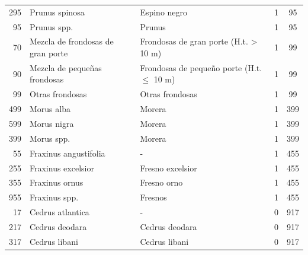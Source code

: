 \begin{longtable}{r p{4cm} p{5cm} c c}
    295           & Prunus spinosa                    & Espino negro                                  & 1             & 95             \\
    95            & Prunus spp.                       & Prunus                                        & 1             & 95             \\
    70            & Mezcla de frondosas de gran porte & Frondosas de gran porte (H.t. > 10 m)         & 1             & 99             \\
    90            & Mezcla de pequeñas frondosas      & Frondosas de pequeño porte (H.t. $\leq$ 10 m) & 1             & 99             \\
    99            & Otras frondosas                   & Otras frondosas                               & 1             & 99             \\
    499           & Morus alba                        & Morera                                        & 1             & 399            \\
    599           & Morus nigra                       & Morera                                        & 1             & 399            \\
    399           & Morus spp.                        & Morera                                        & 1             & 399            \\
    55            & Fraxinus angustifolia             & -                                             & 1             & 455            \\
    255           & Fraxinus excelsior                & Fresno excelsior                              & 1             & 455            \\
    355           & Fraxinus ornus                    & Fresno orno                                   & 1             & 455            \\
    955           & Fraxinus spp.                     & Fresnos                                       & 1             & 455            \\
    17            & Cedrus atlantica                  & -                                             & 0             & 917            \\
    217           & Cedrus deodara                    & Cedrus deodara                                & 0             & 917            \\
    317           & Cedrus libani                     & Cedrus libani                                 & 0             & 917            \\

\end{longtable}
